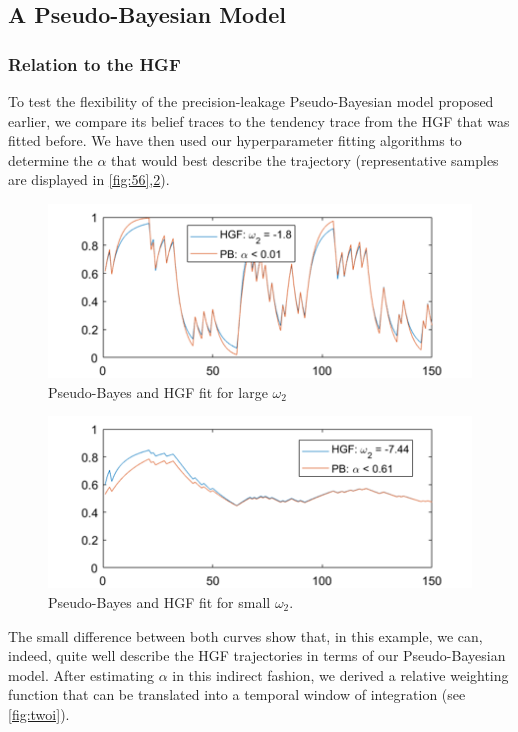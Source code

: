 \documentclass{article}
\begin{document}
\begin{multicols}{2}
\subsection*{A Pseudo-Bayesian Model}
\subsubsection*{Relation to the HGF}

To test the flexibility of the precision-leakage Pseudo-Bayesian model proposed earlier, we compare its belief traces to the tendency trace from the HGF that was fitted before. We have then used our hyperparameter fitting algorithms to determine the $\alpha$ that would best describe the trajectory (representative samples are displayed in \autoref{fig:56},\ref{fig:55}).

\begin{figure}[H]
\centering
\includegraphics[width=.5\textwidth]{fit1.png}
\caption{Pseudo-Bayes and HGF fit for large $\omega_2$}
\label{fig:56}
\end{figure}



\begin{figure}[H]
\centering
\includegraphics[width=.5\textwidth]{fit2.png}
\caption{Pseudo-Bayes and HGF fit for small $\omega_2$.}
\label{fig:55}
\end{figure}
\vspace{-3mm}
The small difference between both curves show that, in this example, we can, indeed, quite well describe the HGF trajectories in terms of our Pseudo-Bayesian model. After estimating $\alpha$ in this indirect fashion, we derived a relative weighting function that can be translated into a temporal window of integration (see \autoref{fig:twoi}).


\end{multicols}
\end{document}
